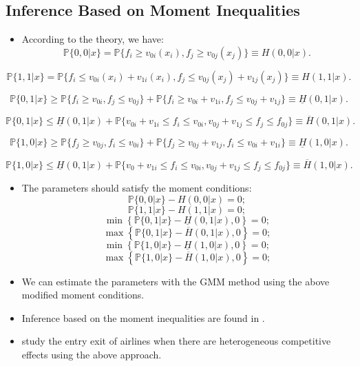 \documentclass[]{book}
\providecommand{\tightlist}{%
  \setlength{\itemsep}{0pt}\setlength{\parskip}{0pt}}
\begin{document}
\subsection{Inference Based on Moment
Inequalities}\label{inference-based-on-moment-inequalities}

\begin{itemize}
\tightlist
\item
  According to the theory, we have: \[
  \mathbb{P}\{0, 0|x\} = \mathbb{P}\{f_{i} \ge v_{0i}(x_{i}), f_{j} \ge v_{0j}(x_{j})\} \equiv H(0, 0|x).
  \]
\end{itemize}

\[
\mathbb{P}\{1, 1|x\} = \mathbb{P}\{f_{i} \le v_{0i}(x_{i}) + v_{1i}(x_{i}), f_{j} \le v_{0j}(x_{j}) + v_{1j}(x_{j}) \} \equiv H(1, 1|x).
\]

\[
\mathbb{P}\{0, 1|x\} \ge \mathbb{P}\{f_{i} \ge v_{0i}, f_{j} \le v_{0j}\} + \mathbb{P}\{f_{i} \ge v_{0i} + v_{1i}, f_{j} \le v_{0j} + v_{1j}\} \equiv \underline{H}(0, 1|x).
\]

\[
\mathbb{P}\{0, 1|x\} \le \underline{H}(0, 1|x) + \mathbb{P}\{v_{0i} + v_{1i} \le f_{i} \le v_{0i}, v_{0j} + v_{1j} \le f_{j} \le f_{0j}\} \equiv \overline{H}(0, 1|x).
\]

\[
\mathbb{P}\{1, 0|x\} \ge \mathbb{P}\{f_{j} \ge v_{0j}, f_{i} \le v_{0i}\} + \mathbb{P}\{f_{j} \ge v_{0j} + v_{1j}, f_{i} \le v_{0i} + v_{1i}\} \equiv \underline{H}(1, 0|x).
\]

\[
\mathbb{P}\{1, 0|x\} \le \underline{H}(0, 1|x) + \mathbb{P}\{v_{0} + v_{1i} \le f_{i} \le v_{0i}, v_{0j} + v_{1j} \le f_{j} \le f_{0j}\} \equiv \overline{H}(1, 0|x).
\]

\begin{itemize}
\tightlist
\item
  The parameters should satisfy the moment conditions: \[
  \mathbb{P}\{0, 0|x\} - H(0, 0|x) = 0;
  \] \[
  \mathbb{P}\{1, 1|x\} - H(1, 1|x) = 0;
  \] \[
  \min\left\{\mathbb{P}\{0, 1|x\} - \underline{H}(0, 1|x), 0\right\} = 0;
  \] \[
  \max\left\{\mathbb{P}\{0, 1|x\} - \overline{H}(0, 1|x), 0\right\} = 0;
  \] \[
  \min\left\{\mathbb{P}\{1, 0|x\} - \underline{H}(1, 0|x), 0\right\} = 0;
  \] \[
  \max\left\{\mathbb{P}\{1, 0|x\} - \overline{H}(1, 0|x), 0\right\} = 0;
  \]
\item
  We can estimate the parameters with the GMM method using the above
  modified moment conditions.
\item
  Inference based on the moment inequalities are found in
  \citet{andrewsInferenceParametersDefined2010}.
\item
  \citet{cilibertoMarketStructureMultiple2009} study the entry exit of
  airlines when there are heterogeneous competitive effects using the
  above approach.
\end{itemize}
\end{document}
